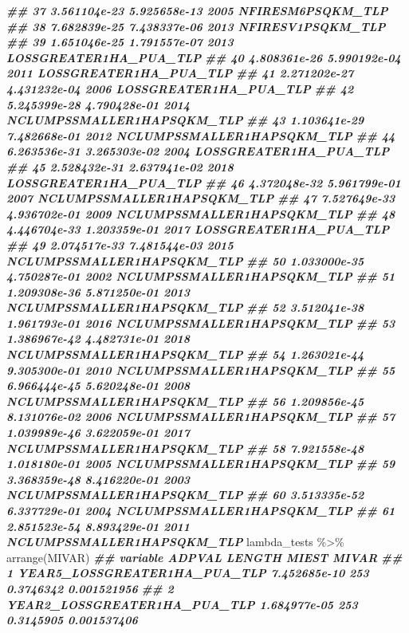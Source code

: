 \documentclass[10pt,landscape,a3paper]{article}
\newenvironment{Shaded}{\begin{snugshade}}{\end{snugshade}}
\newcommand{\DocumentationTok}[1]{\textcolor[rgb]{0.56,0.35,0.01}{\textbf{\textit{#1}}}}
\newcommand{\FunctionTok}[1]{\textcolor[rgb]{0.00,0.00,0.00}{#1}}
\newcommand{\NormalTok}[1]{#1}
\newcommand{\SpecialCharTok}[1]{\textcolor[rgb]{0.00,0.00,0.00}{#1}}
\begin{document}
\begin{Shaded}
\begin{Highlighting}[]
\DocumentationTok{\#\# 37 3.561104e{-}23 5.925658e{-}13 2005          NFIRESM6PSQKM\_TLP}
\DocumentationTok{\#\# 38 7.682839e{-}25 7.438337e{-}06 2013          NFIRESV1PSQKM\_TLP}
\DocumentationTok{\#\# 39 1.651046e{-}25 1.791557e{-}07 2013     LOSSGREATER1HA\_PUA\_TLP}
\DocumentationTok{\#\# 40 4.808361e{-}26 5.990192e{-}04 2011     LOSSGREATER1HA\_PUA\_TLP}
\DocumentationTok{\#\# 41 2.271202e{-}27 4.431232e{-}04 2006     LOSSGREATER1HA\_PUA\_TLP}
\DocumentationTok{\#\# 42 5.245399e{-}28 4.790428e{-}01 2014 NCLUMPSSMALLER1HAPSQKM\_TLP}
\DocumentationTok{\#\# 43 1.103641e{-}29 7.482668e{-}01 2012 NCLUMPSSMALLER1HAPSQKM\_TLP}
\DocumentationTok{\#\# 44 6.263536e{-}31 3.265303e{-}02 2004     LOSSGREATER1HA\_PUA\_TLP}
\DocumentationTok{\#\# 45 2.528432e{-}31 2.637941e{-}02 2018     LOSSGREATER1HA\_PUA\_TLP}
\DocumentationTok{\#\# 46 4.372048e{-}32 5.961799e{-}01 2007 NCLUMPSSMALLER1HAPSQKM\_TLP}
\DocumentationTok{\#\# 47 7.527649e{-}33 4.936702e{-}01 2009 NCLUMPSSMALLER1HAPSQKM\_TLP}
\DocumentationTok{\#\# 48 4.446704e{-}33 1.203359e{-}01 2017     LOSSGREATER1HA\_PUA\_TLP}
\DocumentationTok{\#\# 49 2.074517e{-}33 7.481544e{-}03 2015 NCLUMPSSMALLER1HAPSQKM\_TLP}
\DocumentationTok{\#\# 50 1.033000e{-}35 4.750287e{-}01 2002 NCLUMPSSMALLER1HAPSQKM\_TLP}
\DocumentationTok{\#\# 51 1.209308e{-}36 5.871250e{-}01 2013 NCLUMPSSMALLER1HAPSQKM\_TLP}
\DocumentationTok{\#\# 52 3.512041e{-}38 1.961793e{-}01 2016 NCLUMPSSMALLER1HAPSQKM\_TLP}
\DocumentationTok{\#\# 53 1.386967e{-}42 4.482731e{-}01 2018 NCLUMPSSMALLER1HAPSQKM\_TLP}
\DocumentationTok{\#\# 54 1.263021e{-}44 9.305300e{-}01 2010 NCLUMPSSMALLER1HAPSQKM\_TLP}
\DocumentationTok{\#\# 55 6.966444e{-}45 5.620248e{-}01 2008 NCLUMPSSMALLER1HAPSQKM\_TLP}
\DocumentationTok{\#\# 56 1.209856e{-}45 8.131076e{-}02 2006 NCLUMPSSMALLER1HAPSQKM\_TLP}
\DocumentationTok{\#\# 57 1.039989e{-}46 3.622059e{-}01 2017 NCLUMPSSMALLER1HAPSQKM\_TLP}
\DocumentationTok{\#\# 58 7.921558e{-}48 1.018180e{-}01 2005 NCLUMPSSMALLER1HAPSQKM\_TLP}
\DocumentationTok{\#\# 59 3.368359e{-}48 8.416220e{-}01 2003 NCLUMPSSMALLER1HAPSQKM\_TLP}
\DocumentationTok{\#\# 60 3.513335e{-}52 6.337729e{-}01 2004 NCLUMPSSMALLER1HAPSQKM\_TLP}
\DocumentationTok{\#\# 61 2.851523e{-}54 8.893429e{-}01 2011 NCLUMPSSMALLER1HAPSQKM\_TLP}
\NormalTok{lambda\_tests }\SpecialCharTok{\%\textgreater{}\%} \FunctionTok{arrange}\NormalTok{(MIVAR)}
\DocumentationTok{\#\#                              variable       ADPVAL LENGTH     MIEST       MIVAR}
\DocumentationTok{\#\# 1        YEAR5\_LOSSGREATER1HA\_PUA\_TLP 7.452685e{-}10    253 0.3746342 0.001521956}
\DocumentationTok{\#\# 2        YEAR2\_LOSSGREATER1HA\_PUA\_TLP 1.684977e{-}05    253 0.3145905 0.001537406}

\end{Highlighting}
\end{Shaded}
\end{document}
